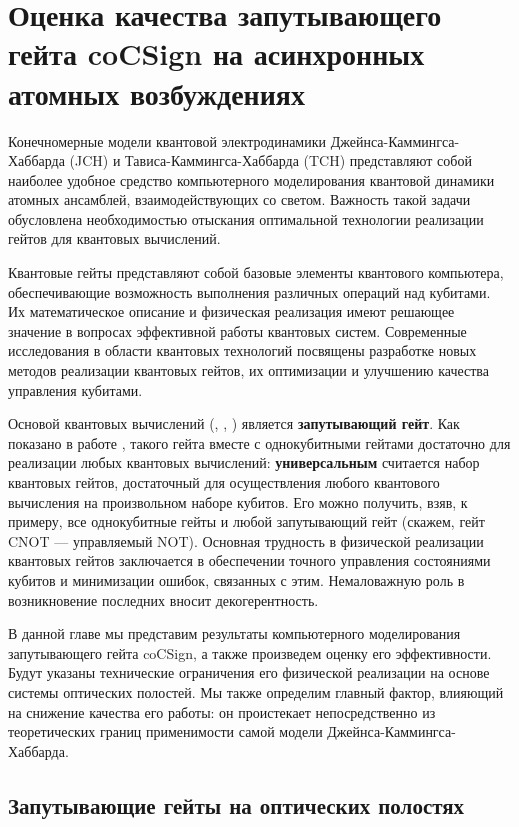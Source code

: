 \chapter{Оценка качества запутывающего гейта coCSign на асинхронных атомных возбуждениях}\label{ch:ch5}

Конечномерные модели квантовой электродинамики Джейнса-Каммингса-Хаббарда (JCH) и Тависа-Каммингса-Хаббарда (TCH) представляют собой наиболее удобное средство компьютерного моделирования квантовой динамики атомных ансамблей, взаимодействующих со светом. Важность такой задачи обусловлена необходимостью отыскания оптимальной технологии реализации гейтов для квантовых вычислений.

Квантовые гейты представляют собой базовые элементы квантового компьютера, обеспечивающие возможность выполнения различных операций над кубитами. Их математическое описание и физическая реализация имеют решающее значение в вопросах эффективной работы квантовых систем. Современные исследования в области квантовых технологий посвящены разработке новых методов реализации квантовых гейтов, их оптимизации и улучшению качества управления кубитами.

Основой квантовых вычислений (\cite{feynman}, \cite{grover}, \cite{shor}) является \textbf{запутывающий гейт}. Как показано в работе \cite{quantum_gates_barenco}, такого гейта вместе с однокубитными гейтами достаточно для реализации любых квантовых вычислений: \textbf{универсальным} считается набор квантовых гейтов, достаточный для осуществления любого квантового вычисления на произвольном наборе кубитов. Его можно получить, взяв, к примеру, все однокубитные гейты и любой запутывающий гейт (скажем, гейт CNOT --- управляемый NOT). Основная трудность в физической реализации квантовых гейтов заключается в обеспечении точного управления состояниями кубитов и минимизации ошибок, связанных с этим. Немаловажную роль в возникновение последних вносит декогерентность.

В данной главе мы представим результаты компьютерного моделирования запутывающего гейта coCSign, а также произведем оценку его эффективности. Будут указаны технические ограничения его физической реализации на основе системы оптических полостей. Мы также определим главный фактор, влияющий на снижение качества его работы: он проистекает непосредственно из теоретических границ применимости самой модели Джейнса-Каммингса-Хаббарда.

\clearpage
\section{Запутывающие гейты на оптических полостях}\label{sec:ch5/sect1}

